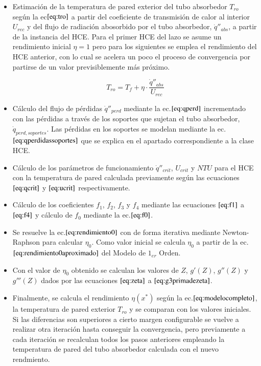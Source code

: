\begin{itemize}
\item
Estimación de la temperatura de pared exterior del tubo absorbedor \(T_{ro}\) según la ec\(\eqref{eq:tro}\) a partir del coeficiente de transmisión de calor al interior \(U_{rec}\) y del flujo de radiación abosorbido por el tubo absorbedor, \(\dot q''_{abs}\), a partir de la instancia del HCE. Para el primer HCE del lazo se asume un rendimiento inicial \(\eta=1\) pero para los siguientes se emplea el rendimiento del HCE anterior, con lo cual se acelera un poco el proceso de convergencia por partirse de un valor previsiblemente más próximo.

\begin{equation}
    T_{ro} = T_f + \eta \cdot \frac{\dot q''_{abs}}{U_{rec}}
    \label{eq:tro}
\end{equation}

\item
  Cálculo del flujo de pérdidas \(\dot q''_{perd}\) mediante la   ec.\(\eqref{eq:qperd}\) incrementado con las pérdidas a través de los   soportes que sujetan el tubo absorbedor, \(\dot q_{perd,soportes}\).   Las pérdidas en los soportes se modelan mediante la   ec.\(\eqref{eq:qperdidassoportes}\) que se explica en el apartado   correspondiente a la clase HCE.
\item
  Cálculo de los parámetros de funcionamiento \(\dot q''_{crit}\),   \(U_{crit}\) y \(NTU\) para el HCE con la temperatura de pared   calculada previamente según las ecuaciones \(\eqref{eq:qcrit}\) y   \(\eqref{eq:ucrit}\) respectivamente.
\item
  Cálculo de los coeficientes \(f_1\), \(f_2\), \(f_3\) y \(f_4\)   mediante las ecuaciones \(\eqref{eq:f1}\) a \(\eqref{eq:f4}\) y   cálculo de \(f_0\) mediante la ec.\(\eqref{eq:f0}\).
\item
  Se resuelve la ec.\(\eqref{eq:rendimiento0}\) con de forma iterativa   mediante Newton-Raphson para calcular \(\eta_0\). Como valor inicial   se calcula \(\eta_0\) a partir de la   ec.\(\eqref{eq:rendimiento0aproximado}\) del Modelo de \(1_{er}\)  Orden.
\item
  Con el valor de \(\eta_0\) obtenido se calculan los valores de \(Z\),   \(g'(Z)\), \(g''(Z)\) y \(g'''(Z)\) dados por las ecuaciones   \(\eqref{eq:zeta}\) a \(\eqref{eq:g3primadezeta}\). 
\item
  Finalmente, se calcula el rendimiento \(\eta(x^*)\) según la   ec.\(\eqref{eq:modelocompleto}\), la temperatura de pared exterior   \(T_{ro}\) y se comparan con los valores iniciales. Si las diferencias   son superiores a cierto margen configurable se vuelve a realizar otra   iteración hasta conseguir la convergencia, pero previamente a cada   iteración se recalculan todos los pasos anteriores empleando la   temperatura de pared del tubo absorbedor calculada con el nuevo
  rendmiento. 
\end{itemize}

